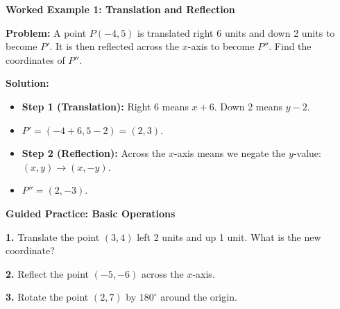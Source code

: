 \documentclass[12pt, letterpaper, fleqn]{article}
\begin{document}
\vspace{3mm}

\begin{tcolorbox}[colback=white, colframe=black!25, boxrule=0.6pt, arc=4mm, left=6mm, right=6mm, top=5mm, bottom=5mm]

\textbf{Worked Example 1: Translation and Reflection}

\medskip

\textbf{Problem:} A point $P(-4, 5)$ is translated right 6 units and down 2 units to become $P'$. It is then reflected across the $x$-axis to become $P''$. Find the coordinates of $P''$.

\medskip

\textbf{Solution:}
\begin{itemize}
    \item \textbf{Step 1 (Translation):} Right 6 means $x + 6$. Down 2 means $y - 2$.
    \item $P' = (-4 + 6, 5 - 2) = (2, 3)$.
    \item \textbf{Step 2 (Reflection):} Across the $x$-axis means we negate the $y$-value: $(x, y) \rightarrow (x, -y)$.
    \item $P'' = (2, -3)$.
\end{itemize}

\end{tcolorbox}

\vspace{4mm}

\begin{tcolorbox}[colback=white!15, colframe=black, boxrule=1.5pt, arc=4mm, left=6mm, right=6mm, top=5mm, bottom=5mm]

\textbf{Guided Practice: Basic Operations}

\medskip

\noindent
\textbf{1.} Translate the point $(3, 4)$ left 2 units and up 1 unit. What is the new coordinate? 
\vspace{1.5cm}

\noindent
\textbf{2.} Reflect the point $(-5, -6)$ across the $x$-axis. 
\vspace{1.5cm}

\noindent
\textbf{3.} Rotate the point $(2, 7)$ by $180^\circ$ around the origin. 
\vspace{1.5cm}

\end{tcolorbox}
\end{document}
